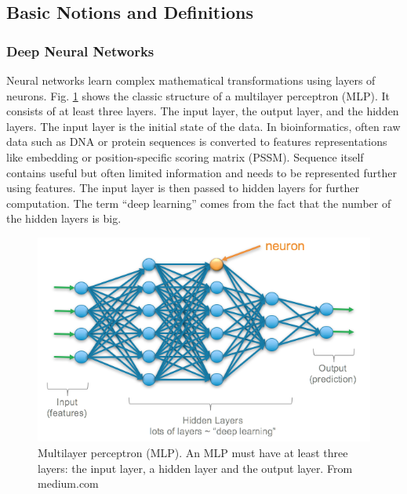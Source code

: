 \subsection{Basic Notions and Definitions}
\subsubsection{Deep Neural Networks}
Neural networks learn complex mathematical transformations using layers of neurons. Fig. \ref{fig_mlp} shows the classic structure of a multilayer perceptron (MLP). It consists of at least three layers. The input layer, the output layer, and the hidden layers. The input layer is the initial state of the data. In bioinformatics, often raw data such as DNA or protein sequences is converted to features representations like embedding or position-specific scoring matrix (PSSM). Sequence itself contains useful but often limited information and needs to be represented further using features. The input layer is then passed to hidden layers for further computation. The term “deep learning” comes from the fact that the number of the hidden layers is big.
\begin{figure}[h!]
\begin{center}
\includegraphics[width = 13cm]{img/multiplayer_perceptron.png}
\caption[Multilayer perceptron (MLP)]{Multilayer perceptron (MLP). An MLP must have at least three layers: the input layer, a hidden layer and the output layer. From medium.com \label{fig_mlp}}
\end{center}
\end{figure}

